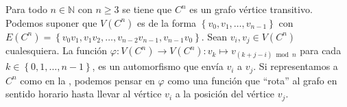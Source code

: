 \begin{Ejm}
   Para todo $n\in\mathbb{N}$ con $n\ge 3$ se tiene que $C^n$ es un grafo vértice transitivo. Podemos suponer que $V(C^n)$ es de la forma $\left\lbrace v_0,v_1, \dots, v_{n-1}\right\rbrace$ con $E(C^n)=\left\lbrace v_0v_1, v_1v_2, \dots ,v_{n-2}v_{n-1}, v_{n-1}v_0\right\rbrace$. Sean $v_i,v_j\in V(C^n)$ cualesquiera. La función $\varphi :V(C^n)\to V(C^n):v_k\mapsto v_{(k+j-i)\bmod n}$ para cada $k\in\left\lbrace 0,1,\dots ,n-1\right\rbrace$, es un automorfismo que envía $v_i$ a $v_j$. Si representamos a $C^n$ como en la , podemos pensar en $\varphi$ como una función que ``rota'' al grafo en sentido horario hasta llevar al vértice $v_i$ a la posición del vértice $v_j$.\clearpage
   
\end{Ejm}

